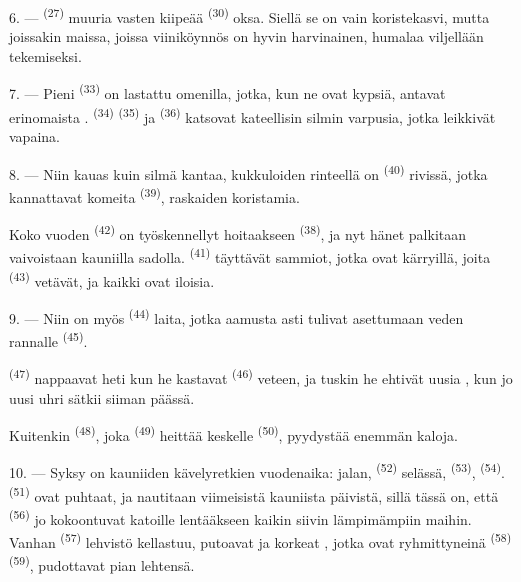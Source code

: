 \VUsaut{6.0mm}
\VUsaut{3.4mm}

6. ---  \textsuperscript{(27)} muuria vasten kiipeää
 \textsuperscript{(30)} oksa. Siellä se on vain koristekasvi,
mutta joissakin maissa, joissa viiniköynnös on hyvin harvinainen, humalaa
viljellään  tekemiseksi.

7. --- Pieni  \textsuperscript{(33)} on lastattu omenilla,
jotka, kun ne ovat kypsiä, antavat erinomaista .
 \textsuperscript{(34)} 
\textsuperscript{(35)} ja  \textsuperscript{(36)} katsovat
kateellisin silmin varpusia, jotka leikkivät vapaina.

8. --- Niin kauas kuin silmä kantaa, kukkuloiden rinteellä on 
\textsuperscript{(40)} rivissä, jotka kannattavat komeita 
\textsuperscript{(39)}, raskaiden  koristamia.

Koko vuoden  \textsuperscript{(42)} on työskennellyt
hoitaakseen  \textsuperscript{(38)}, ja nyt hänet
palkitaan vaivoistaan kauniilla sadolla. 
\textsuperscript{(41)} täyttävät sammiot, jotka ovat kärryillä, joita
 \textsuperscript{(43)} vetävät, ja kaikki ovat iloisia.

\VUsaut{5.0mm}
\VUsaut{3.4mm}

9. --- Niin on myös  \textsuperscript{(44)} laita, jotka
aamusta asti tulivat asettumaan veden rannalle 
\textsuperscript{(45)}.

 \textsuperscript{(47)} nappaavat  heti kun he
kastavat  \textsuperscript{(46)} veteen, ja tuskin he ehtivät
uusia , kun jo uusi uhri sätkii siiman päässä.

Kuitenkin  \textsuperscript{(48)}, joka
 \textsuperscript{(49)} heittää 
keskelle  \textsuperscript{(50)}, pyydystää enemmän kaloja.

10. --- Syksy on kauniiden kävelyretkien vuodenaika: jalan, 
\textsuperscript{(52)} selässä,  \textsuperscript{(53)},
 \textsuperscript{(54)}.  \textsuperscript{(51)}
ovat puhtaat, ja nautitaan viimeisistä kauniista päivistä, sillä tässä on, että
 \textsuperscript{(56)} jo kokoontuvat katoille lentääkseen
kaikin siivin lämpimämpiin maihin. Vanhan 
\textsuperscript{(57)} lehvistö kellastuu,  putoavat ja korkeat
, jotka ovat ryhmittyneinä 
\textsuperscript{(58)}  \textsuperscript{(59)}, pudottavat
pian lehtensä.

